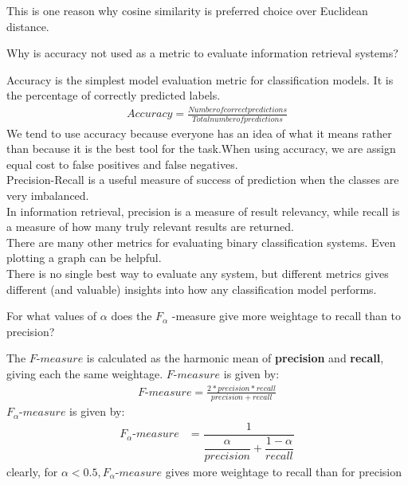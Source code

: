 \documentclass[11pt]{exam}
\begin{document}
\begin{questions}
\begin{solution}
    This is one reason why cosine similarity is preferred choice over Euclidean distance. 
\end{solution}
\question Why is accuracy not used as a metric to evaluate information retrieval systems?
\begin{solution}
    Accuracy is the simplest model evaluation metric for classification models. It is the percentage of correctly predicted labels.
    \begin{align}
        Accuracy = \frac{Number of correct predictions}{Total number of predictions}
    \end{align}
    We tend to use accuracy because everyone has an idea of what it means rather than because it is the best tool for the task.When using accuracy, we are assign equal cost to false positives and false negatives. \\
    Precision-Recall is a useful measure of success of prediction when the classes are very imbalanced.\\
    In information retrieval, precision is a measure of result relevancy, while recall is a measure of how many truly relevant results are returned.\\
    There are many other metrics for evaluating binary classification systems. Even plotting a graph can be helpful.\\
    There is no single best way to evaluate any system, but different metrics gives different (and valuable) insights into how any classification model performs.
\end{solution}
\question For what values of $\alpha$ does the $F_{\alpha}$ -measure give more weightage to recall than to precision?
\begin{solution}
    The $F\mbox{-}measure$ is calculated as the harmonic mean of \textbf{precision} and \textbf{recall}, giving each the same weightage. $F\mbox{-}measure$ is given by:
    \begin{align}
        F\mbox{-}measure = \frac{2*precision*recall}{precision+recall}
    \end{align}
    $F_{\alpha}\mbox{-}measure$ is given by:
    \begin{align}
        F_{\alpha}\mbox{-}measure &= \dfrac{1}{\dfrac{\alpha}{precision}+\dfrac{1-\alpha}{recall}}
    \end{align}
    clearly, for $\alpha < 0.5, F_{\alpha}\mbox{-}measure$ gives more weightage to recall than for precision \\

\end{solution}
\end{questions}
\end{document}
